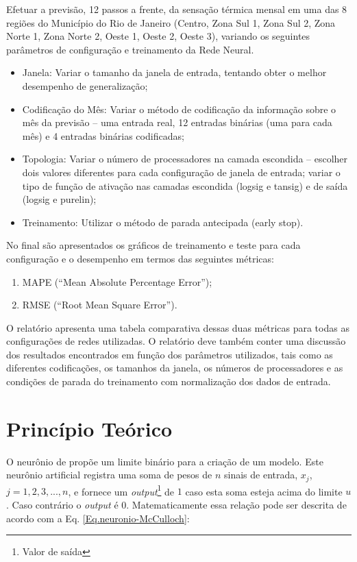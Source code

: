 \documentclass[journal, a4paper]{IEEEtran}
\begin{document}
Efetuar a previsão, 12 passos a frente, da sensação térmica mensal em uma das 8 regiões do Município do Rio de Janeiro (Centro, Zona Sul 1, Zona Sul 2, Zona Norte 1, Zona Norte 2, Oeste 1, Oeste 2, Oeste 3), variando os seguintes parâmetros de configuração e treinamento da
Rede Neural.\\

\begin{itemize}[\textbf{Testes}]
	\item{Janela:} Variar o tamanho da janela de entrada, tentando obter o melhor desempenho de generalização;
	\item{Codificação do Mês:} Variar o método de codificação da informação sobre o mês da
	previsão – uma entrada real, 12 entradas binárias (uma para cada mês)
	e 4 entradas binárias codificadas;
	\item{Topologia:} Variar o número de processadores na camada escondida – escolher
	dois valores diferentes para cada configuração de janela de entrada;
	variar o tipo de função de ativação nas camadas escondida (logsig e
	tansig) e de saída (logsig e purelin);
	\item{Treinamento:} Utilizar o método de parada antecipada (early stop).
\end{itemize}

No final são apresentados os gráficos de treinamento e teste para cada configuração e
o desempenho em termos das seguintes métricas:
\begin{enumerate}
	\item MAPE (“Mean Absolute Percentage Error”);
	\item RMSE (“Root Mean Square Error”).
\end{enumerate}

O relatório apresenta uma tabela comparativa dessas duas métricas para todas as
configurações de redes utilizadas. O relatório deve também conter uma discussão dos
resultados encontrados em função dos parâmetros utilizados, tais como as diferentes
codificações, os tamanhos da janela, os números de processadores e as condições de parada
do treinamento com normalização dos dados de entrada.


\section{Princípio Teórico}
O neurônio de \citet{McCulloch1943} propõe um limite binário para a criação de um modelo. Este neurônio artificial registra uma soma de pesos de $n$ sinais de entrada, $x_{j}$, $j=1,2,3,...,n$, e fornece um \textit{output}\footnote{Valor de saída} de $1$ caso esta soma esteja acima do limite $u$. Caso contrário o \textit{output} é $0$. Matematicamente essa relação pode ser descrita de acordo com a Eq. \ref{Eq.neuronio-McCulloch}:
\end{document}
